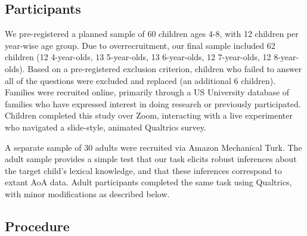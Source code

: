 \documentclass[10pt, letterpaper]{article}
\begin{document}
\hypertarget{participants}{%
\subsection{Participants}\label{participants}}

We pre-registered a planned sample of 60 children ages 4-8, with 12
children per year-wise age group. Due to overrecruitment, our final
sample included 62 children (12 4-year-olds, 13 5-year-olds, 13
6-year-olds, 12 7-year-olds, 12 8-year-olds). Based on a pre-registered
exclusion criterion, children who failed to answer all of the questions
were excluded and replaced (an additional 6 children). Families were
recruited online, primarily through a US University database of families
who have expressed interest in doing research or previously
participated. Children completed this study over Zoom, interacting with
a live experimenter who navigated a slide-style, animated Qualtrics
survey.

A separate sample of 30 adults were recruited via Amazon Mechanical
Turk. The adult sample provides a simple test that our task elicits
robust inferences about the target child's lexical knowledge, and that
these inferences correspond to extant AoA data. Adult participants
completed the same task using Qualtrics, with minor modifications as
described below.

\hypertarget{procedure}{%
\subsection{Procedure}\label{procedure}}
\end{document}
